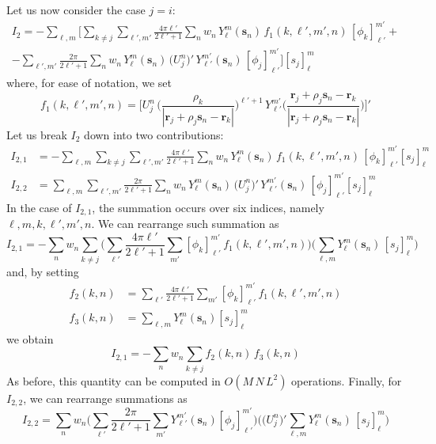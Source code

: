 \documentclass[12pt,letterpaper,oneside]{article}
\theoremstyle{definition}
\begin{document}
Let us now consider the case $j =i$:
\begin{multline*}
I_2 = -  \sum_{\ell,m} \Bigg[  \sum_{k\ne j} \sum_{\ell',m'}\frac{4 \pi \ell'}{2 \ell'+1} \sum_n w_n \, Y_\ell^m(\boldsymbol{s}_n)\, f_1(k,\ell',m',n) \,  [\phi_k]_{\ell'}^{m'} +  \\ 
 - \sum_{\ell',m'} \frac{2\pi}{2 \ell'+1}  \sum_n w_n \, Y_\ell^m(\boldsymbol{s}_n) \, \big( U_j^n \big)' \, Y_{\ell'}^{m'}(\boldsymbol{s}_n) \, [\phi_j]_{\ell '}^{m '} \Bigg] [s_j]_\ell^m
\end{multline*}
where, for ease of notation, we set
\[
f_1(k,\ell',m',n) =  \bigg[ U_j^n  \, \bigg( \frac{\rho_k}{|\boldsymbol{r}_j + \rho_j \boldsymbol{s}_n - \boldsymbol{r}_k|} \bigg)^{\ell'+1} \, Y_{\ell'}^{m'} \bigg( \frac{\boldsymbol{r}_j + \rho_j \boldsymbol{s}_n - \boldsymbol{r}_k}{|\boldsymbol{r}_j + \rho_j \boldsymbol{s}_n - \boldsymbol{r}_k |} \bigg) \bigg]'
\]
Let us break $I_2$ down into two contributions:
\begin{align*}
I_{2,1} & = -  \sum_{\ell,m}   \sum_{k\ne j} \sum_{\ell',m'}\frac{4 \pi \ell'}{2 \ell'+1} \sum_n w_n \, Y_\ell^m(\boldsymbol{s}_n) \, f_1(k,\ell',m',n)\,  [\phi_k]_{\ell'}^{m'}  [s_j]_\ell^m \\
I_{2,2}&  = \sum_{\ell,m}
\sum_{\ell',m'} \frac{2\pi}{2 \ell'+1}  \sum_n w_n \, Y_\ell^m(\boldsymbol{s}_n) \, \big( U_j^n \big)' \, Y_{\ell'}^{m'}(\boldsymbol{s}_n) \, [\phi_j]_{\ell '}^{m '} [s_j]_\ell^m
\end{align*}
In the case of $I_{2,1}$, the summation occurs over six indices, namely $\ell,m,k,\ell',m',n$. We can rearrange such summation as
\[
I_{2,1}  = - \sum_n w_n   \sum_{k\ne j} \bigg( \sum_{\ell'}  \frac{4 \pi \ell'}{2 \ell'+1}   \sum_{m'}[\phi_k]_{\ell'}^{m'} \, f_1(k,\ell',m',n) \bigg)  \bigg( \sum_{\ell,m}  Y_\ell^m(\boldsymbol{s}_n)\, [s_j]_\ell^m \bigg)
\]
and, by setting
\begin{align*}
f_2(k,n) & =\sum_{\ell'}  \frac{4 \pi \ell'}{2 \ell'+1}   \sum_{m'} [\phi_k]_{\ell'}^{m'} \,f_1(k,\ell',m',n) \\
f_3(k,n) & = \sum_{\ell,m}  Y_\ell^m(\boldsymbol{s}_n)  [s_j]_\ell^m
\end{align*}
we obtain
\[
I_{2,1} = - \sum_n w_n \sum_{k \ne j} f_2(k,n) \, f_3(k,n)
\]
As before, this quantity can be computed in $O(M \, N \, L^2)$ operations. Finally, for $I_{2,2}$, we can rearrange summations as
\[
I_{2,2}  = \sum_n w_n \bigg( \sum_{\ell'} \frac{2\pi}{2 \ell'+1} \sum_{m'} Y_{\ell'}^{m'}(\boldsymbol{s}_n) [\phi_j]_{\ell '}^{m '} \bigg) \bigg( \big( U_j^n \big)' \sum_{\ell,m} Y_\ell^m(\boldsymbol{s}_n) \, [s_j]_\ell^m \bigg)
\]
\end{document}
